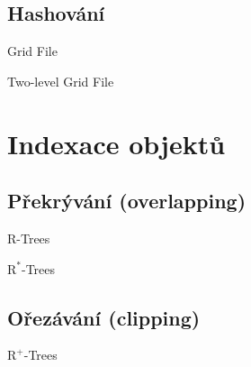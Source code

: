 
\subsection{Hashování}

Grid File

Two-level Grid File



\section{Indexace objektů}


\subsection{Překrývání (overlapping)}

R-Trees

$\text{R}^*$-Trees

\subsection{Ořezávání (clipping)}

$\text{R}^+$-Trees
